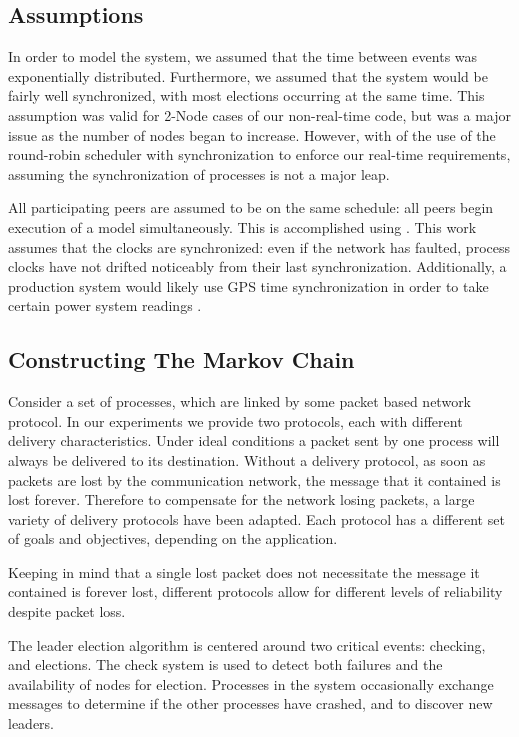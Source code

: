 \subsection{Assumptions}
In order to model the system, we assumed that the time between events was exponentially distributed. Furthermore, we assumed that the system would be fairly well synchronized, with most elections occurring at the same time. This assumption was valid for 2-Node cases of our non-real-time code, but was a major issue as the number of nodes began to increase. However, with of the use of the round-robin scheduler with synchronization to enforce our real-time requirements, assuming the synchronization of processes is not a major leap.

All participating peers are assumed to be on the same schedule: all peers begin execution of a model simultaneously. This is accomplished using \cite{DCS}. This work assumes that the clocks are synchronized: even if the network has faulted, process clocks have not drifted noticeably from their last synchronization. Additionally, a production system would likely use GPS time synchronization in order to take certain power system readings \cite{PHASORREADINGS}.

\subsection{Constructing The Markov Chain}

Consider a set of processes, which are linked by some packet based network protocol. In our experiments we provide two protocols, each with different delivery characteristics. Under ideal conditions a packet sent by one process will always be delivered to its destination. Without a delivery protocol, as soon as packets are lost by the communication network, the message that it contained is lost forever. Therefore to compensate for the network losing packets, a large variety of delivery protocols have been adapted. Each protocol has a different set of goals and objectives, depending on the application.

Keeping in mind that a single lost packet does not necessitate the message it contained is forever lost, different protocols allow for different levels of reliability despite packet loss.

The leader election algorithm is centered around two critical events: checking, and elections. The check system is used to detect both failures and the availability of nodes for election. Processes in the system occasionally exchange messages to determine if the other processes have crashed, and to discover new leaders.

